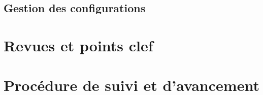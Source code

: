 \documentclass{../../res/univ-projet}
\begin{document}
\subsection{Gestion des configurations}

\section{Revues et points clef}

\section{Procédure de suivi et d'avancement}
\end{document}
